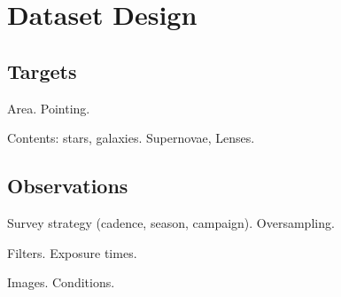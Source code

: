 \section{Dataset Design}
\def\secname{\chpname:design}
\label{\secname}



\subsection{Targets}

Area. Pointing.

Contents: stars, galaxies. Supernovae, Lenses.


\subsection{Observations}

Survey strategy (cadence, season, campaign). Oversampling.

Filters. Exposure times.

Images. Conditions.


